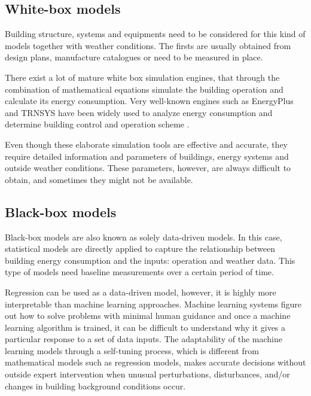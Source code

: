 \documentclass[10pt, conference, compsocconf]{IEEEtran}
\begin{document}
\subsection{White-box models}


Building structure, systems and equipments need to be considered for this kind of models together with weather conditions. The firsts are usually obtained from design plans, manufacture catalogues or need to be measured in place.

There exist a lot of mature white box simulation engines, that through the combination of mathematical equations simulate the building operation and calculate its energy consumption. Very well-known engines such as EnergyPlus \cite{crawley2001energyplus} and TRNSYS \cite{TRNSYS} have been widely used to analyze energy consumption and determine building control and operation scheme \cite{crawley2008contrasting}.

Even though these elaborate simulation tools are effective and accurate, they require detailed information and parameters of buildings, energy systems and outside weather conditions. These parameters, however, are always difficult to obtain, and sometimes they might not be available.

\subsection{Black-box models}


Black-box models are also known as solely data-driven models. In this case, statistical models are directly applied to capture the relationship between building energy consumption and the inputs: operation and weather data. This type of models need baseline measurements over a certain period of time.

Regression can be used as a data-driven model, however, it is highly more interpretable than machine learning approaches. 
Machine learning systems figure out how to solve problems with minimal human guidance and once a machine learning algorithm is trained, it can be difficult to understand why it gives a particular response to a set of data inputs. The adaptability of the machine learning models through a self-tuning process, which is different from mathematical models such as regression models, makes accurate decisions without outside expert intervention when unusual perturbations, disturbances, and/or changes in building background conditions occur.
\end{document}

